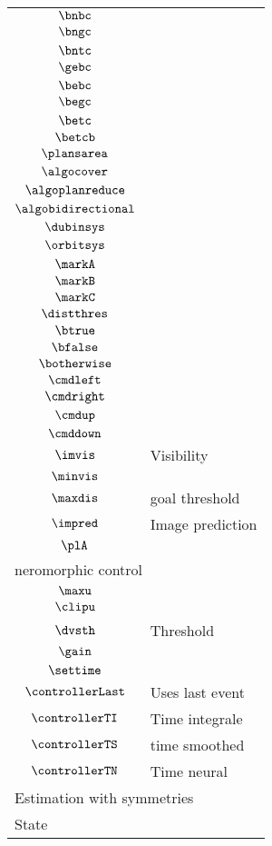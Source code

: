 \begin{longtable}{cl}
 $\bnbc$ & \\ 
 $\bngc$ & \\ 
 $\bntc$ & \\ 
 $\gebc$ & \\ 
 $\bebc$ & \\ 
 $\begc$ & \\ 
 $\betc$ & \\ 
 $\betcb$ & \\ 
 $\plansarea$ & \\ 
 $\algocover$ & \\ 
 $\algoplanreduce$ & \\ 
 $\algobidirectional$ & \\ 
 $\dubinsys$ & \\ 
 $\orbitsys$ & \\ 
 $\markA$ & \\ 
 $\markB$ & \\ 
 $\markC$ & \\ 
 $\distthres$ & \\ 
 $\btrue$ & \\ 
 $\bfalse$ & \\ 
 $\botherwise$ & \\ 
 $\cmdleft$ & \\ 
 $\cmdright$ & \\ 
 $\cmdup$ & \\ 
 $\cmddown$ & \\ 
 $\imvis$ &  Visibility\\ 
 $\minvis$ & \\ 
 $\maxdis$ &  goal threshold\\ 
 $\impred$ &  Image prediction\\ 
 $\plA$ & \\ 
 \multicolumn{2}{l}{neromorphic control}\\ 
 \hline
$\maxu$ & \\ 
 $\clipu$ & \\ 
 $\dvsth$ &  Threshold\\ 
 $\gain$ & \\ 
 $\settime$ & \\ 
 $\controllerLast$ &  Uses last event\\ 
 $\controllerTI$ &  Time integrale\\ 
 $\controllerTS$ &  time smoothed\\ 
 $\controllerTN$ &  Time neural\\ 
 \multicolumn{2}{l}{Estimation with symmetries}\\ 
 \hline
\multicolumn{2}{l}{State}\\ 

\end{longtable}
